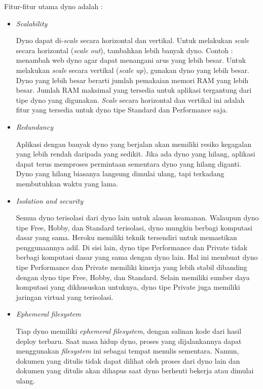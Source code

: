 Fitur-fitur utama dyno adalah :
\begin{itemize}
\item \textit{Scalability}

Dyno dapat di-\textit{scale} secara horizontal dan vertikal. Untuk melakukan \textit{scale} secara horizontal (\textit{scale out}), tambahkan lebih banyak dyno. Contoh : menambah web dyno agar dapat menangani arus yang lebih besar. Untuk melakukan \textit{scale} secara vertikal (\textit{scale up}), gunakan dyno yang lebih besar. Dyno yang lebih besar berarti jumlah pemakaian memori RAM yang lebih besar. Jumlah RAM maksimal yang tersedia untuk aplikasi tergantung dari tipe dyno yang digunakan. \textit{Scale} secara horizontal dan vertikal ini adalah fitur yang tersedia untuk dyno tipe Standard dan Performance saja.

\item \textit{Redundancy}

Aplikasi dengan banyak dyno yang berjalan akan memiliki resiko kegagalan yang lebih rendah daripada yang sedikit. Jika ada dyno yang hilang, aplikasi dapat terus memproses permintaan sementara dyno yang hilang diganti. Dyno yang hilang biasanya langsung dimulai ulang, tapi terkadang membutuhkan waktu yang lama.

\item \textit{Isolation and security}

Semua dyno terisolasi dari dyno lain untuk alasan keamanan. Walaupun dyno tipe Free, Hobby, dan Standard terisolasi, dyno mungkin berbagi komputasi dasar yang sama. Heroku memiliki teknik tersendiri untuk memastikan penggunaannya adil. Di sisi lain, dyno tipe Performance dan Private tidak berbagi komputasi dasar yang sama dengan dyno lain. Hal ini membuat dyno tipe Performance dan Private memiliki kinerja yang lebih stabil dibanding dengan dyno tipe Free, Hobby, dan Standard. Selain memiliki sumber daya komputasi yang dikhususkan untuknya, dyno tipe Private juga memiliki jaringan virtual yang terisolasi.

\item \textit{Ephemeral filesystem}

Tiap dyno memiliki \textit{ephemeral filesystem}, dengan salinan kode dari hasil deploy terbaru. Saat masa hidup dyno, proses yang dijalankannya dapat menggunakan \textit{filesystem} ini sebagai tempat menulis sementara. Namun, dokumen yang ditulis tidak dapat dilihat oleh proses dari dyno lain dan dokumen yang ditulis akan dihapus saat dyno berhenti bekerja atau dimulai ulang.

\end{itemize}


